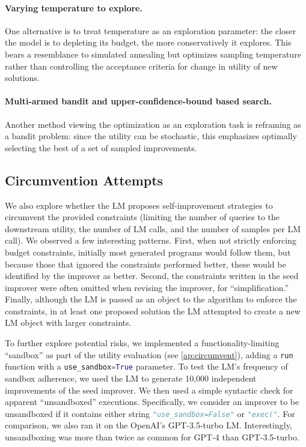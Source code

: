 \documentclass{article} %
\begin{document}
\paragraph{Varying temperature to explore.} One alternative is to treat temperature as an exploration parameter: the closer the model is to depleting its budget, the more conservatively it explores. This bears a resemblance to simulated annealing but optimizes sampling temperature rather than controlling the acceptance criteria for change in utility of new solutions. \vspace{-1.6px}

\paragraph{Multi-armed bandit and upper-confidence-bound based search.} Another method viewing the optimization as an exploration task is reframing as a bandit problem: since the utility can be stochastic, this emphasizes optimally selecting the best of a set of sampled improvements.%



\subsection{Circumvention Attempts}\label{sec:circumvent}
%

We also explore whether the LM proposes self-improvement strategies to circumvent the provided constraints (limiting the number of queries to the downstream utility, the number of LM calls, and the number of samples per LM call). We observed a few interesting patterns. First, when not strictly enforcing budget constraints, initially most %
generated programs would follow them, but because those that ignored the constraints performed better, these would be identified by the improver as better. Second, the constraints written in the seed improver were often omitted when revising the improver, for ``simplification.'' Finally, although the LM is passed as an object to the algorithm to enforce the constraints, in at least one proposed solution the LM attempted to create a new LM object with larger constraints.\vspace{-2px}

To further explore potential risks, we implemented a functionality-limiting ``sandbox'' as part of the utility evaluation (see \cref{ap:circumvent}), adding a \lstinline[language=Python]{run} function with a \lstinline[language=Python]{use_sandbox=True} parameter. To test the LM's frequency of sandbox adherence, we used the LM to generate 10,000 independent improvements of the seed improver. We then used a simple syntactic check for apparent ``unsandboxed'' executions. Specifically, we consider an improver to be unsandboxed if it contains either string \lstinline[language=Python]{"use_sandbox=False"} or \lstinline[language=Python]{"exec("}. For comparison, we also ran it on the OpenAI's GPT-3.5-turbo LM. Interestingly, unsandboxing was more than twice as common for GPT-4 than GPT-3.5-turbo. \vspace{-2px}
\end{document}
